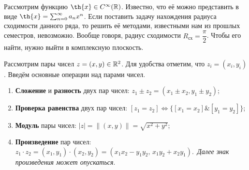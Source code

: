 \setcounter{section}{-1}

\noindent
\begin{minipage}[c]{0.3\textwidth}
    \centering
\end{minipage}%
\hfill
\begin{minipage}[c]{0.7\textwidth}
Рассмотрим функцию \(\th{x} \in C^{\infty} (\R)\). Известно, что её можно представить в виде
\(\th{x} = \sum_{n = 0}^{\infty} a_n x^n\). Если поставить задачу нахождения радиуса сходимости
данного ряда, то решить её методами, известными нам из прошлых семестров, невозможно. Вообще
говоря, радиус сходимости \(R_{\text{сх}} = \dfrac{\pi}{2}\). Чтобы его найти, нужно выйти в
комплексную плоскость.
\end{minipage}



Рассмотрим пары чисел \(z = (x, y) \in \mathbb{R}^2\). Для удобства отметим, что \(z_i = (x_i, y_i)\).
Введём основные операции над парами чисел.

\begin{enumerate}
\item \label{1:add_sub_pair_num} \textbf{Сложение} и \textbf{разность} двух пар чисел: \(z_1 \pm z_2
    = (x_1 \pm x_2, y_1 \pm y_2)\);
\item \label{1:criterion_equality} \textbf{Проверка равенства} двух пар чисел: \(\left[z_1 =
    z_2\right] \iff \{\left[x_1 = x_2\right] \& \left[y_1 = y_2\right]\}\);
\item \label{1:abs_pair_num} \textbf{Модуль} пары чисел: \(|z| = \left\|(x, y)\right\| = \sqrt{x^2 +
    y^2}\);
\item \label{1:mult_pair_num} \textbf{Произведение} пар чисел: \(z_1 \cdot z_2 = (x_1, y_1) \cdot
    (x_2, y_2) = (x_1 x_2 - y_1 y_2, \, x_1 y_2 + x_2 y_1)\).\ \textit{Далее знак произведения может
    опускаться}.
\end{enumerate}

